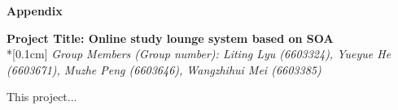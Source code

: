 \documentclass[runningheads]{llncs}
\begin{document}

\begin{flushleft}
\huge{\textbf{Appendix}}
\end{flushleft}
\begin{center}
\Large{\textbf{Project Title:  Online study lounge system based on SOA }} \\*[0.1cm]%
\large{\emph{Group Members (Group number): Liting Lyu (6603324), Yueyue  He (6603671), Muzhe Peng (6603646), Wangzhihui Mei (6603385)}} %
\end{center}


\noindent This project...
\end{document}
